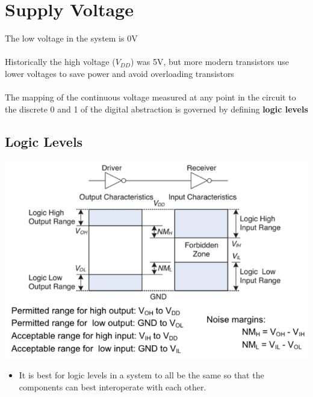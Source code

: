 \documentclass{article}[18pt]
\begin{document}
\section{Supply Voltage}
The low voltage in the system is 0V\\
\\
Historically the high voltage ($V_{DD}$) was 5V, but more modern transistors use lower voltages to save power and avoid overloading transistors\\
\\
The mapping of the continuous voltage measured at any point in the circuit to the discrete 0 and 1 of the digital abstraction is governed by defining \textbf{logic levels}
\subsection{Logic Levels}
\includegraphics[width=15cm]{LogicLevels.png}
\begin{itemize}
\item It is best for logic levels in a system to all be the same so that the components can best interoperate with each other.
\end{itemize}
\end{document}
